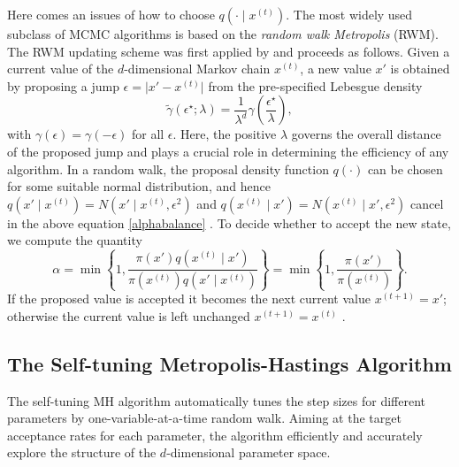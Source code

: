 Here comes an issues of how to choose $q\left(\cdot\mid x^{(t)}\right)$. The most widely used subclass of MCMC algorithms is based on the \textit{random walk Metropolis} (RWM). The RWM updating scheme was first applied by \cite{metropolis1953equation} and proceeds as follows. Given a current value of the $d$-dimensional Markov chain $x^{(t)}$, a new value $x'$ is obtained by proposing a jump $\epsilon = \lvert x' - x^{(t)} \rvert  $ from the pre-specified Lebesgue density 
\begin{equation}\label{stepsizeep}
\tilde{\gamma}\left(\epsilon^\star;\lambda\right) = \frac{1}{\lambda^d}\gamma \left( \frac{\epsilon^\star}{\lambda} \right),
\end{equation}
with $\gamma(\epsilon) = \gamma(-\epsilon)$ for all $\epsilon$. Here, the positive $\lambda$ governs the overall distance of the proposed jump and plays a crucial role in determining the efficiency of any algorithm. In a random walk, the proposal density function $q(\cdot)$ can be chosen for some suitable normal distribution, and hence $q\left(x'\mid x^{\left(t\right)}\right)=N\left(x'\mid x^{\left(t\right)},\epsilon^2\right)$ and $q\left(x^{\left(t\right)}\mid x'\right)=N\left(x^{\left(t\right)}\mid x',\epsilon^2\right)$ cancel in the above equation \eqref{alphabalance} \citep{sherlock2016adaptive}. To decide whether to accept the new state, we compute the quantity
\begin{equation}
\alpha=\min \left\lbrace 1,\frac{\pi\left(x'\right) q\left( x^{\left(t\right)}\mid x'\right) }{\pi\left(x^{\left(t\right)}\right)  q\left( x'\mid x^{\left(t\right)} \right) }  \right\rbrace= \min \left\lbrace 1,\frac{\pi\left(x'\right)  }{\pi\left(x^{\left(t\right)}\right) }  \right\rbrace.
\end{equation}
If the proposed value is accepted it becomes the next current value $x^{(t+1)}= x'$; otherwise the current value is left unchanged $x^{(t+1)} = x^{(t)}$ \citep{sherlock2010random}. 


\subsection{The Self-tuning Metropolis-Hastings Algorithm}

The self-tuning MH algorithm automatically tunes the step sizes for different parameters by one-variable-at-a-time random walk. Aiming at the target acceptance rates for each parameter, the algorithm efficiently and accurately explore the structure of the $d$-dimensional parameter space. 

